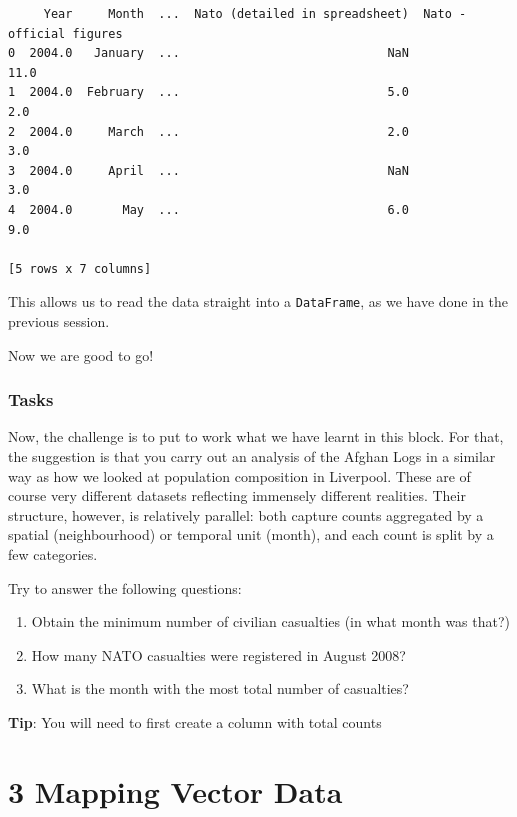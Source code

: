 \documentclass[
  letterpaper,
  DIV=11,
  numbers=noendperiod]{scrreprt}
\providecommand{\tightlist}{%
  \setlength{\itemsep}{0pt}\setlength{\parskip}{0pt}}\usepackage{longtable,booktabs,array}
\begin{document}
\begin{verbatim}
     Year     Month  ...  Nato (detailed in spreadsheet)  Nato - official figures
0  2004.0   January  ...                             NaN                     11.0
1  2004.0  February  ...                             5.0                      2.0
2  2004.0     March  ...                             2.0                      3.0
3  2004.0     April  ...                             NaN                      3.0
4  2004.0       May  ...                             6.0                      9.0

[5 rows x 7 columns]
\end{verbatim}

This allows us to read the data straight into a \texttt{DataFrame}, as
we have done in the previous session.

Now we are good to go!

\section*{Tasks}\label{tasks}


Now, the challenge is to put to work what we have learnt in this block.
For that, the suggestion is that you carry out an analysis of the Afghan
Logs in a similar way as how we looked at population composition in
Liverpool. These are of course very different datasets reflecting
immensely different realities. Their structure, however, is relatively
parallel: both capture counts aggregated by a spatial (neighbourhood) or
temporal unit (month), and each count is split by a few categories.

Try to answer the following questions:

\begin{enumerate}
\def\labelenumi{\arabic{enumi}.}
\tightlist
\item
  Obtain the minimum number of civilian casualties (in what month was
  that?)
\item
  How many NATO casualties were registered in August 2008?
\item
  What is the month with the most total number of casualties?
\end{enumerate}

\textbf{Tip}: You will need to first create a column with total counts

\part{3 Mapping Vector Data}
\end{document}
